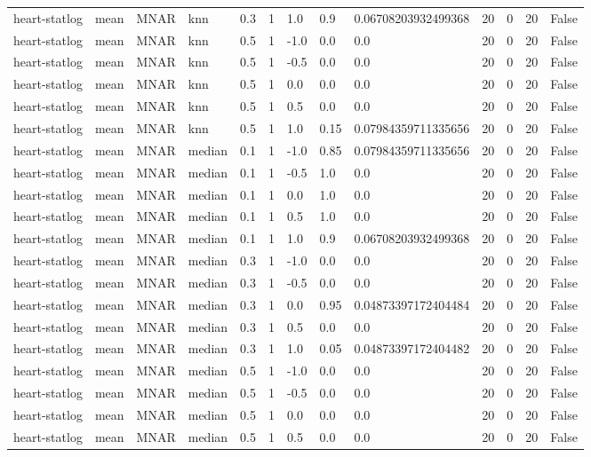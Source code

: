 \begin{tabular}{lllllllllllll}
heart-statlog & mean & MNAR & knn & 0.3 & 1 & 1.0 & 0.9 & 0.06708203932499368 & 20 & 0 & 20 & False \\
heart-statlog & mean & MNAR & knn & 0.5 & 1 & -1.0 & 0.0 & 0.0 & 20 & 0 & 20 & False \\
heart-statlog & mean & MNAR & knn & 0.5 & 1 & -0.5 & 0.0 & 0.0 & 20 & 0 & 20 & False \\
heart-statlog & mean & MNAR & knn & 0.5 & 1 & 0.0 & 0.0 & 0.0 & 20 & 0 & 20 & False \\
heart-statlog & mean & MNAR & knn & 0.5 & 1 & 0.5 & 0.0 & 0.0 & 20 & 0 & 20 & False \\
heart-statlog & mean & MNAR & knn & 0.5 & 1 & 1.0 & 0.15 & 0.07984359711335656 & 20 & 0 & 20 & False \\
heart-statlog & mean & MNAR & median & 0.1 & 1 & -1.0 & 0.85 & 0.07984359711335656 & 20 & 0 & 20 & False \\
heart-statlog & mean & MNAR & median & 0.1 & 1 & -0.5 & 1.0 & 0.0 & 20 & 0 & 20 & False \\
heart-statlog & mean & MNAR & median & 0.1 & 1 & 0.0 & 1.0 & 0.0 & 20 & 0 & 20 & False \\
heart-statlog & mean & MNAR & median & 0.1 & 1 & 0.5 & 1.0 & 0.0 & 20 & 0 & 20 & False \\
heart-statlog & mean & MNAR & median & 0.1 & 1 & 1.0 & 0.9 & 0.06708203932499368 & 20 & 0 & 20 & False \\
heart-statlog & mean & MNAR & median & 0.3 & 1 & -1.0 & 0.0 & 0.0 & 20 & 0 & 20 & False \\
heart-statlog & mean & MNAR & median & 0.3 & 1 & -0.5 & 0.0 & 0.0 & 20 & 0 & 20 & False \\
heart-statlog & mean & MNAR & median & 0.3 & 1 & 0.0 & 0.95 & 0.04873397172404484 & 20 & 0 & 20 & False \\
heart-statlog & mean & MNAR & median & 0.3 & 1 & 0.5 & 0.0 & 0.0 & 20 & 0 & 20 & False \\
heart-statlog & mean & MNAR & median & 0.3 & 1 & 1.0 & 0.05 & 0.04873397172404482 & 20 & 0 & 20 & False \\
heart-statlog & mean & MNAR & median & 0.5 & 1 & -1.0 & 0.0 & 0.0 & 20 & 0 & 20 & False \\
heart-statlog & mean & MNAR & median & 0.5 & 1 & -0.5 & 0.0 & 0.0 & 20 & 0 & 20 & False \\
heart-statlog & mean & MNAR & median & 0.5 & 1 & 0.0 & 0.0 & 0.0 & 20 & 0 & 20 & False \\
heart-statlog & mean & MNAR & median & 0.5 & 1 & 0.5 & 0.0 & 0.0 & 20 & 0 & 20 & False \\

\end{tabular}
